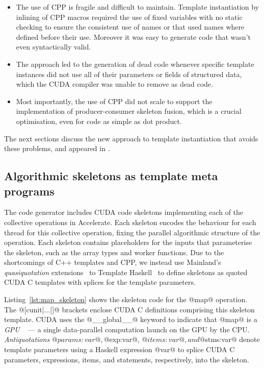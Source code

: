 \begin{itemize}
    \item The use of CPP is fragile and difficult to maintain. Template
        instantiation by inlining of CPP macros required the use of fixed
        variables with no static checking to ensure the consistent use of names
        or that used names where defined before their use. Moreover it was easy
        to generate code that wasn't even syntactically valid.

    \item The approach led to the generation of dead code whenever specific
        template instances did not use all of their parameters or fields of
        structured data, which the CUDA compiler was unable to remove as dead
        code.

    \item Most importantly, the use of CPP did not scale to support the
        implementation of producer-consumer skeleton fusion, which is a crucial
        optimisation, even for code as simple as dot product.

\end{itemize}

The next sections discuss the new approach to template instantiation that avoids
these problems, and appeared in \cite{CliftonEverest:2014vi}.


\subsection{Algorithmic skeletons as template meta programs}

The code generator includes CUDA code skeletons implementing each of the
collective operations in Accelerate. Each skeleton encodes the behaviour for
each thread for this collective operation, fixing the parallel algorithmic
structure of the operation. Each skeleton contains placeholders for the inputs
that parameterise the skeleton, such as the array types and worker functions.
Due to the shortcomings of C++ templates and CPP, we instead use Mainland's
\emph{quasiquotation} extensions~\cite{Mainland:2007bl} to Template
Haskell~\cite{Sheard:2002wu} to define skeletons as quoted CUDA C templates
with splices for the template parameters.

Listing~\ref{lst:map_skeleton} shows the skeleton code for the @map@
operation. The @[cunit|...|]@ brackets enclose CUDA C definitions
comprising this skeleton template. CUDA uses the @__global__@ keyword to
indicate that @map@ is a \emph{GPU} ~\cite{NVIDIA:2012wf}
--- a single data-parallel computation launch on the GPU by the CPU\@.
\emph{Antiquotations} @$params:var@, @$exp:var@,
@$items:var@, and @$stms:var@ denote template parameters using a
Haskell expression @var@ to splice CUDA C parameters, expressions, items,
and statements, respectively, into the skeleton.

